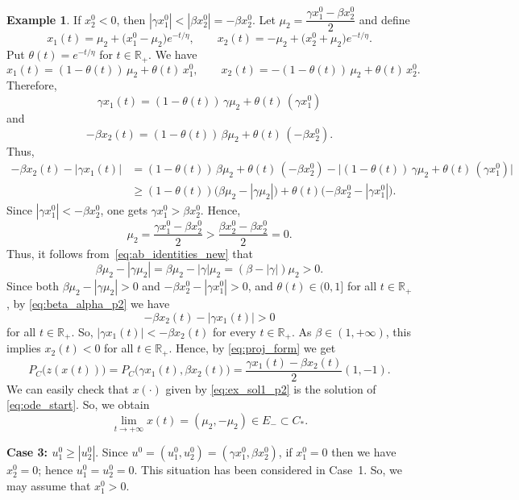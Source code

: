 \documentclass[11pt]{article}
\theoremstyle{definition}
\newtheorem{example}{Example}
\theoremstyle{remark}
\begin{document}
\begin{example}
{		If $x_2^0 < 0$, then $|\gamma x_1^0| < |\beta x_2^0| = -\beta x_2^0$. Let $\mu_2 = \dfrac{\gamma x_1^0 - \beta x_2^0}{2}$ and define
		\begin{equation}\label{eq:ex_sol1_p2}
			x_1(t) = \mu_2 + \big(x_1^0 - \mu_2\big)e^{-t/\eta}, \qquad x_2(t) = -\mu_2 + \big(x_2^0 + \mu_2\big)e^{-t/\eta}.
		\end{equation}
	Put $\theta(t) = e^{-t/\eta}$ for $t \in \mathbb{R}_+$. We have
		$$
		x_1(t) = (1-\theta(t))\,\mu_2 + \theta(t)\,x_1^0, \qquad x_2(t) = -(1-\theta(t))\,\mu_2 + \theta(t)\,x_2^0.
		$$
		Therefore,
		$$
		\gamma x_1(t) = (1-\theta(t))\,\gamma \mu_2 + \theta(t)\,(\gamma x_1^0)
		$$
		and
		$$
		-\beta x_2(t) = (1-\theta(t))\,\beta \mu_2 + \theta(t)\,(-\beta x_2^0).
		$$
		Thus,
		\begin{equation}\label{eq:beta_alpha_p2}
			\begin{aligned}
				-\beta x_2(t) - |\gamma x_1(t)| &= (1-\theta(t))\,\beta \mu_2 + \theta(t)\,(-\beta x_2^0) - \big|(1-\theta(t))\,\gamma \mu_2 + \theta(t)\,(\gamma x_1^0)\big| \\
				&\geq (1-\theta(t))\big(\beta \mu_2 - |\gamma \mu_2|\big) + \theta(t)\big({-\beta x_2^0} - |\gamma x_1^0|\big).
			\end{aligned}
		\end{equation}
		Since $|\gamma x_1^0| < -\beta x_2^0$, one gets $\gamma x_1^0 > \beta x_2^0$. Hence,
		$$
		\mu_2 = \frac{\gamma x_1^0 - \beta x_2^0}{2} > \frac{\beta x_2^0 - \beta x_2^0}{2} = 0.
		$$
		Thus, it follows from~\eqref{eq:ab_identities_new} that
		$$
		\beta \mu_2 - |\gamma \mu_2| = \beta \mu_2 - |\gamma|\mu_2 = (\beta - |\gamma|)\mu_2 > 0.
		$$
		Since both $\beta \mu_2 - |\gamma \mu_2| > 0$ and $-\beta x_2^0 - |\gamma x_1^0| > 0$, and $\theta(t) \in (0,1]$ for all $t \in \mathbb{R}_+$, by \eqref{eq:beta_alpha_p2} we have
		$$
		-\beta x_2(t) - |\gamma x_1(t)| > 0
		$$
		for all $t \in \mathbb{R}_+$. So, $|\gamma x_1(t)| < -\beta x_2(t)$ for every $t \in \mathbb{R}_+$. As $\beta \in (1,+\infty)$, this implies $x_2(t) < 0$ for all $t \in \mathbb{R}_+$. Hence, by \eqref{eq:proj_form} we get
		$$
		P_C\big(z(x(t))\big) = P_C\big(\gamma x_1(t), \beta x_2(t)\big) = \frac{\gamma x_1(t) - \beta x_2(t)}{2}(1,-1).
		$$
		We can easily check that $x(\cdot)$ given by \eqref{eq:ex_sol1_p2} is the solution of \eqref{eq:ode_start}. So, we obtain
		$$
		\lim_{t\to+\infty} x(t) = (\mu_2, -\mu_2) \in E_- \subset C_*.
		$$
			
			\medskip
			\noindent\textbf{Case 3: $u_1^0\geq |u_2^0|$}. Since $u^0=(u_1^0, u_2^0)=(\gamma x_1^0, \beta x_2^0)$, if $x_1^0=0$ then we have $x_2^0=0$; hence $u_1^0= u_2^0 =0$. This situation has been considered in Case~1. So,  we may assume that $x^0_1>0$.
			
}
\end{example}
\end{document}
